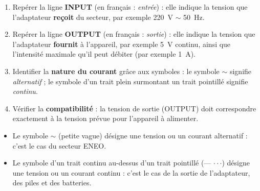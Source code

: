 \documentclass[11pt]{article}
\newcommand{\cle}[1]{{\popxbold\color{popdark}#1}}
\begin{document}
\begin{methode}
\begin{enumerate}
\item Repérer la ligne \textbf{INPUT} (en français : \emph{entrée}) : elle indique la tension que l'adaptateur \textbf{reçoit} du secteur, par exemple \SI{220}{V} $\sim$ \SI{50}{Hz}.
\item Repérer la ligne \textbf{OUTPUT} (en français : \emph{sortie}) : elle indique la tension que l'adaptateur \textbf{fournit} à l'appareil, par exemple \SI{5}{V} continu, ainsi que l'intensité maximale qu'il peut débiter (par exemple \SI{1}{A}).
\item Identifier la \textbf{nature du courant} grâce aux symboles : le symbole $\sim$ signifie \emph{alternatif} ; le symbole d'un trait plein surmontant un trait pointillé signifie \emph{continu}.
\item Vérifier la \textbf{compatibilité} : la tension de sortie (OUTPUT) doit correspondre exactement à la tension prévue pour l'appareil à alimenter.
\end{enumerate}
\end{methode}

\begin{aretenir}
\begin{itemize}
\item Le symbole $\sim$ (petite vague) désigne une tension ou un courant \cle{alternatif} : c'est le cas du secteur ENEO.
\item Le symbole d'un trait continu au-dessus d'un trait pointillé (--- $\cdot\cdot\cdot$) désigne une tension ou un courant \cle{continu} : c'est le cas de la sortie de l'adaptateur, des piles et des batteries.
\end{itemize}
\end{aretenir}
\end{document}
